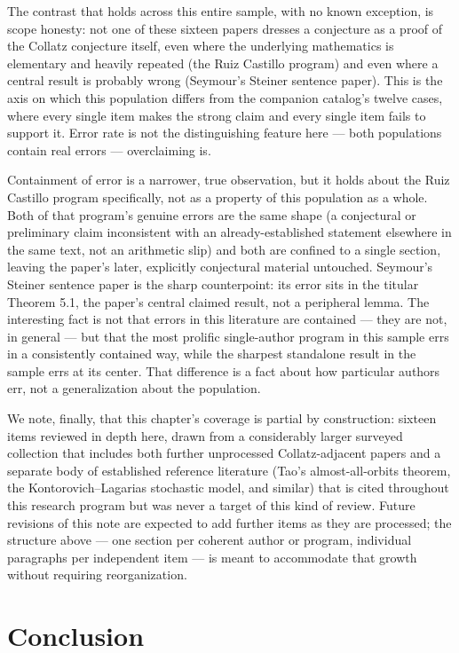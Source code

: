 \documentclass[11pt]{article}
\begin{document}
The contrast that holds across this entire sample, with no known
exception, is scope honesty: not one of these sixteen papers dresses a
conjecture as a proof of the Collatz conjecture itself, even where the
underlying mathematics is elementary and heavily repeated (the Ruiz
Castillo program) and even where a central result is probably wrong
(Seymour's Steiner sentence paper). This is the axis on which this
population differs from the companion catalog's twelve cases, where
every single item makes the strong claim and every single item fails to
support it. Error rate is not the distinguishing feature here --- both
populations contain real errors --- overclaiming is.

Containment of error is a narrower, true observation, but it holds
about the Ruiz Castillo program specifically, not as a property of this
population as a whole. Both of that program's genuine errors are the
same shape (a conjectural or preliminary claim inconsistent with an
already-established statement elsewhere in the same text, not an
arithmetic slip) and both are confined to a single section, leaving the
paper's later, explicitly conjectural material untouched. Seymour's
Steiner sentence paper is the sharp counterpoint: its error sits in the
titular Theorem 5.1, the paper's central claimed result, not a
peripheral lemma. The interesting fact is not that errors in this
literature are contained --- they are not, in general --- but that the
most prolific single-author program in this sample errs in a
consistently contained way, while the sharpest standalone result in the
sample errs at its center. That difference is a fact about how
particular authors err, not a generalization about the population.

We note, finally, that this chapter's coverage is partial by
construction: sixteen items reviewed in depth here, drawn from a
considerably larger surveyed collection that includes both further
unprocessed Collatz-adjacent papers and a separate body of established
reference literature (Tao's almost-all-orbits theorem, the
Kontorovich--Lagarias stochastic model, and similar) that is cited
throughout this research program but was never a target of this kind of
review. Future revisions of this note are expected to add further
items as they are processed; the structure above --- one section per
coherent author or program, individual paragraphs per independent item
--- is meant to accommodate that growth without requiring
reorganization.

\section{Conclusion}
\label{sec:conclusion}
\end{document}
